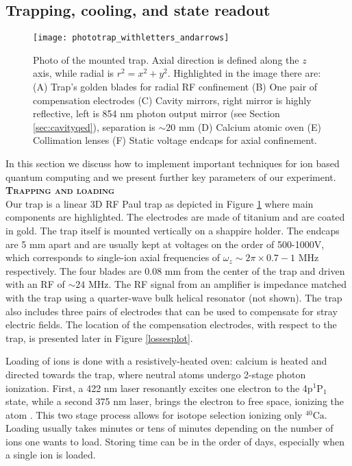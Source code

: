 \subsection{Trapping, cooling, and state readout}
\label{sec:expparameters}
\begin{figure}
\centering
\texttt{[image: phototrap\_withletters\_andarrows]}
\caption{Photo of the mounted trap. Axial direction is defined along the $z$ axis, while radial is $r^2 = x^2 + y^2$. Highlighted in the image there are: (A) Trap's golden blades for radial RF confinement (B) One pair of compensation electrodes (C) Cavity mirrors, right mirror is highly reflective, left is 854 nm photon output mirror (see Section \ref{sec:cavityqed}), separation is $\sim 20$ mm (D) Calcium atomic oven (E) Collimation lenses (F) Static voltage endcaps for axial confinement.}
\label{trapphoto}
\end{figure}
In this section we discuss how to implement important techniques for ion based quantum computing and we present further key parameters of our experiment.\vspace{.5em}\\
\textbf{\textsc{Trapping and loading}}\\
Our trap is a linear 3D RF Paul trap as depicted in Figure \ref{trapphoto} where main components are highlighted. The electrodes are made of titanium and are coated in gold. The trap itself is mounted vertically on a shappire holder. The endcaps are 5 mm apart and are usually kept at voltages on the order of 500-1000V, which corresponds to single-ion axial frequencies of $\omega_z \sim 2\pi \times 0.7-1$ MHz respectively. The four blades are 0.08 mm from the center of the trap and driven with an RF of $\sim 24$ MHz. The RF signal from an amplifier is impedance matched with the trap using a quarter-wave bulk helical resonator (not shown). The trap also includes three pairs of electrodes that can be used to compensate for stray electric fields. The location of the compensation electrodes, with respect to the trap, is presented later in Figure \ref{lossesplot}.\par
Loading of ions is done with a resistively-heated oven: calcium is heated and directed towards the trap, where neutral atoms undergo 2-stage photon ionization. First, a 422 nm laser resonantly excites one electron to the 4p$^1\text{P}_1$ state, while a second 375 nm laser, brings the electron to free space, ionizing the atom \cite{Gulde2001}. This two stage process allows for isotope selection ionizing only $^{40}\text{Ca}$. Loading usually takes minutes or tens of minutes depending on the number of ions one wants to load. Storing time can be in the order of days, especially when a single ion is loaded.\vspace{.5em}\\
